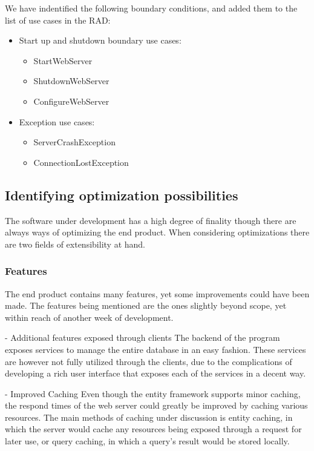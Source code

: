 We have indentified the following boundary conditions, and added them to the list of use cases in the RAD:

\begin{itemize}
	\item Start up and shutdown boundary use cases:
	\begin{itemize}
			\item StartWebServer
			\item ShutdownWebServer
			\item ConfigureWebServer
	\end{itemize}
	\item Exception use cases:
	\begin{itemize}
			\item ServerCrashException
			\item ConnectionLostException
	\end{itemize}
\end{itemize}

\subsection{Identifying optimization possibilities}

The software under development has a high degree of finality though there are always ways of optimizing the end product.
When considering optimizations there are two fields of extensibility at hand.

\subsubsection{Features}

The end product contains many features, yet some improvements could have been made.
The features being mentioned are the ones slightly beyond scope, yet within reach of another week of development.

- Additional features exposed through clients
The backend of the program exposes services to manage the entire database in an easy fashion. These services are however not fully utilized through the clients, due to the complications of developing a rich user interface that exposes each of the services in a decent way.

- Improved Caching
Even though the entity framework supports minor caching, the respond times of the web server could greatly be improved by caching various resources.
The main methods of caching under discussion is entity caching, in which the server would cache any resources being exposed through a request for later use, or query caching, in which a query's result would be stored locally.

